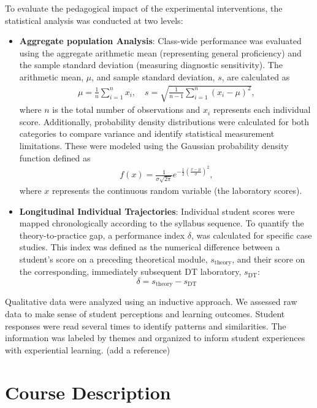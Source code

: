\documentclass[journal]{IEEEtran}
\begin{document}
To evaluate the pedagogical impact of the experimental interventions, the statistical analysis was conducted at two levels: 
\begin{itemize}
    \item \textbf{Aggregate population Analysis}: Class-wide performance was evaluated using the aggregate arithmetic mean (representing general proficiency) and the sample standard deviation (measuring diagnostic sensitivity)\cite{Montgomery2013}. The arithmetic mean, $\mu$, and sample standard deviation, $s$, are calculated as
    \begin{align}
        \mu=\frac{1}{n}\sum_{i=1}^{n}x_i, \quad s=\sqrt{\frac{1}{n-1}\sum_{i=1}^{n}(x_i-\mu)^2},
    \end{align}
    where $n$ is the total number of observations and $x_i$ represents each individual score. Additionally, probability density distributions were calculated for both categories to compare variance and identify statistical measurement limitations. These were modeled using the Gaussian probability density function defined as
    \begin{align}
        f(x)=\frac{1}{\sigma\sqrt{2\pi}}e^{-\frac{1}{2}\left(\frac{x-\mu}{\sigma}\right)^2},
    \end{align}
    where $x$ represents the continuous random variable (the laboratory scores).
    
    \item \textbf{Longitudinal Individual Trajectories}: Individual student scores were mapped chronologically according to the syllabus sequence. To quantify the theory-to-practice gap, a performance index $\delta$, was calculated for specific case studies. This index was defined as the numerical difference between a student's score on a preceding theoretical module, $s_{\text{theory}}$, and their score on the corresponding, immediately subsequent DT laboratory, $s_{\text{DT}}$:
        $$\delta=s_{\text{theory}}-s_{\text{DT}}$$
\end{itemize}

Qualitative data were analyzed using an inductive approach. We assessed raw data to make sense of student perceptions and learning outcomes. Student responses were read several times to identify patterns and similarities. The information was labeled by themes and organized to inform  student experiences with experiential learning. (add a reference)


\section{Course Description}
\label{sec:course-description}
\end{document}
